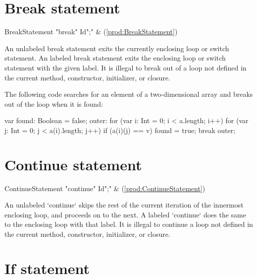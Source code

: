\section{Break statement}

\begin{bbgrammar}
 BreakStatement    \: \xcd"break" Id\opt \xcd";" & (\ref{prod:BreakStatement})\\%
\end{bbgrammar}


An unlabeled break statement exits the currently enclosing loop or switch
statement. An labeled break statement exits the enclosing loop or switch
statement with the given label.
It is illegal to break out of a loop not defined in the current
method, constructor, initializer, or closure.  

The following code searches for an element of a two-dimensional
array and breaks out of the loop when it is found:

\begin{xten}
var found: Boolean = false;
outer: for (var i: Int = 0; i < a.length; i++)
    for (var j: Int = 0; j < a(i).length; j++)
        if (a(i)(j) == v) {
            found = true;
            break outer;
        }
\end{xten}

\section{Continue statement}

\begin{bbgrammar}
 ContinueStatement    \: \xcd"continue" Id\opt \xcd";" & (\ref{prod:ContinueStatement})\\%
\end{bbgrammar}

An unlabeled \xcd`continue` skips the rest of the current iteration of the
innermost enclosing loop, and proceeds on to the next.  A labeled
\xcd`continue` does the same to the enclosing loop with that label.
It is illegal to continue a loop not defined in the current
method, constructor, initializer, or closure.

\section{If statement}

